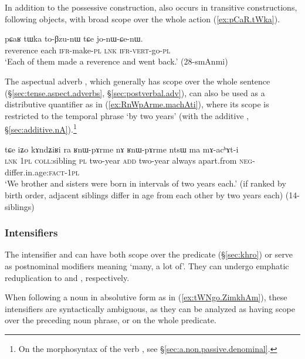 In addition to the possessive construction,  also occurs in transitive constructions, following objects, with broad scope over the whole action (\ref{ex:pCaR.tWka}).

\begin{exe}
\ex \label{ex:pCaR.tWka}
\gll  pɕaʁ tɯka to-βzu-nɯ tɕe jo-nɯ-ɕe-nɯ.  \\
reverence each \textsc{ifr}-make-\textsc{pl} \textsc{lnk} \textsc{ifr}-\textsc{vert}-go-\textsc{pl} \\
\glt `Each of them made a reverence and went back.'  (28-smAnmi) 
\end{exe}

The aspectual adverb , which generally has scope over the whole sentence (§\ref{sec:tense.aspect.adverbs}, §\ref{sec:postverbal.adv}), can also be used as a distributive quantifier as in (\ref{ex:RnWpArme.machAti}), where its scope is restricted to the temporal phrase  `by two years' (with the additive , §\ref{sec:additive.nA}).\footnote{On the morphosyntax of the verb , see §\ref{sec:a.non.passive.denominal}.  }

\begin{exe}
\ex   \label{ex:RnWpArme.machAti}
 \gll tɕe iʑo kɤndʑiʁi ra ʁnɯ-pɤrme nɤ ʁnɯ-pɤrme ntsɯ ma mɤ-acʰɤt-i \\
 \textsc{lnk} \textsc{1pl} \textsc{coll}:sibling \textsc{pl} two-year \textsc{add} two-year always apart.from \textsc{neg}-differ.in.age:\textsc{fact}-\textsc{1pl} \\
\glt `We brother and sisters were born in intervals of two years each.' (if ranked by birth order, adjacent siblings differ in age from each other by two years each) (14-siblings) 
 \end{exe}
 
\subsubsection{Intensifiers} \label{sec:nominal.intensifier}
The intensifier  and  can have both scope over the predicate (§\ref{sec:khro}) or serve as postnominal modifiers meaning `many, a lot of'. They can undergo emphatic reduplication to  and , respectively.

When following a noun in absolutive form as in (\ref{ex:tWNgo.ZimkhAm}), these intensifiers are syntactically ambiguous, as they can be analyzed as having scope over the preceding noun phrase, or on the whole predicate.

